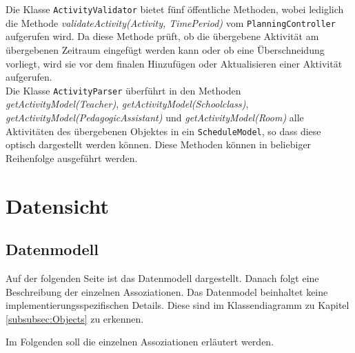 \documentclass[fontsize=12pt,paper=a4,twoside]{scrartcl}
\begin{document}
Die Klasse \texttt{ActivityValidator} bietet fünf öffentliche Methoden, wobei lediglich die Methode \textit{validateActivity(Activity, TimePeriod)} vom \texttt{PlanningController} aufgerufen wird. Da diese Methode prüft, ob die übergebene Aktivität am übergebenen Zeitraum eingefügt werden kann oder ob eine Überschneidung vorliegt, wird sie vor dem finalen Hinzufügen oder Aktualisieren einer Aktivität aufgerufen.\\
Die Klasse \texttt{ActivityParser} überführt in den Methoden \textit{getActivityModel(Teacher)}, \textit{getActivityModel(Schoolclass)}, \textit{getActivityModel(PedagogicAssistant)} und \textit{getActivityModel(Room)} alle Aktivitäten des übergebenen Objektes in ein \texttt{ScheduleModel}, so dass diese optisch dargestellt werden können. Diese Methoden können in beliebiger Reihenfolge ausgeführt werden.
 






\section{Datensicht}
\label{sec:datensicht}
  
\subsection{Datenmodell}
Auf der folgenden Seite ist das Datenmodell dargestellt. Danach folgt eine Beschreibung der einzelnen Assoziationen. Das Datenmodel beinhaltet keine implementierungsspezifischen Details. Diese sind im Klassendiagramm zu Kapitel \ref{subsubsec:Objects} zu erkennen.

Im Folgenden soll die einzelnen Assoziationen erläutert werden.\\
\end{document}

